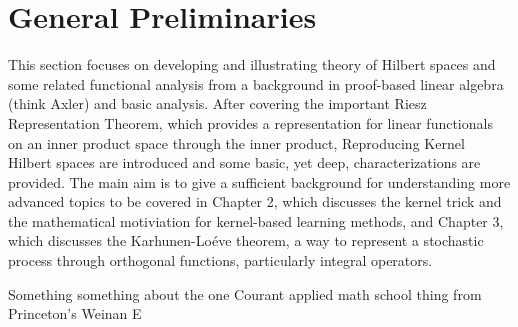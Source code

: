 \documentclass[psamsfonts]{amsart}
\theoremstyle{definition}
\theoremstyle{remark}
\numberwithin{equation}{section}
\begin{document}
\section{General Preliminaries} This section focuses on developing and illustrating theory of Hilbert spaces and some related functional analysis from a background in proof-based linear algebra (think Axler) and basic analysis. After covering the important Riesz Representation Theorem, which provides a representation for linear functionals on an inner product space through the inner product, Reproducing Kernel Hilbert spaces are introduced and some basic, yet deep, characterizations are provided. The main aim is to give a sufficient background for understanding more advanced topics to be covered in Chapter 2, which discusses the kernel trick and the mathematical motiviation for kernel-based learning methods, and Chapter 3, which discusses the Karhunen-Lo\'{e}ve theorem, a way to represent a stochastic process through orthogonal functions, particularly integral operators. 


Something something about the one Courant applied math school thing from Princeton's Weinan E
\end{document}
